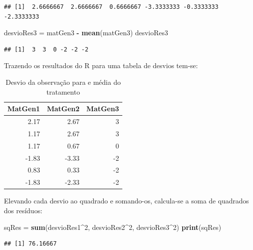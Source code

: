 \documentclass[
]{article}
\newenvironment{Shaded}{\begin{snugshade}}{\end{snugshade}}
\newcommand{\DecValTok}[1]{\textcolor[rgb]{0.00,0.00,0.81}{#1}}
\newcommand{\KeywordTok}[1]{\textcolor[rgb]{0.13,0.29,0.53}{\textbf{#1}}}
\newcommand{\NormalTok}[1]{#1}
\newcommand{\OperatorTok}[1]{\textcolor[rgb]{0.81,0.36,0.00}{\textbf{#1}}}
\newcommand{\StringTok}[1]{\textcolor[rgb]{0.31,0.60,0.02}{#1}}
\begin{document}
\begin{verbatim}
## [1]  2.6666667  2.6666667  0.6666667 -3.3333333 -0.3333333 -2.3333333
\end{verbatim}

\begin{Shaded}
\begin{Highlighting}[]
\NormalTok{desvioRes3 =}\StringTok{ }\NormalTok{matGen3 }\OperatorTok{-}\StringTok{ }\KeywordTok{mean}\NormalTok{(matGen3)}
\NormalTok{desvioRes3}
\end{Highlighting}
\end{Shaded}

\begin{verbatim}
## [1]  3  3  0 -2 -2 -2
\end{verbatim}

Trazendo os resultados do R para uma tabela de desvios tem-se:

\begin{table}

\caption{\label{tab:unnamed-chunk-22}Desvio da observação para e média do tratamento}
\centering
\begin{tabular}[t]{r|r|r}
\hline
MatGen1 & MatGen2 & MatGen3\\
\hline
2.17 & 2.67 & 3\\
\hline
1.17 & 2.67 & 3\\
\hline
1.17 & 0.67 & 0\\
\hline
-1.83 & -3.33 & -2\\
\hline
0.83 & 0.33 & -2\\
\hline
-1.83 & -2.33 & -2\\
\hline
\end{tabular}
\end{table}

Elevando cada desvio ao quadrado e somando-os, calcula-se a soma de quadrados dos resíduos:

\begin{Shaded}
\begin{Highlighting}[]
\NormalTok{sqRes =}\StringTok{ }\KeywordTok{sum}\NormalTok{(desvioRes1}\OperatorTok{^}\DecValTok{2}\NormalTok{, desvioRes2}\OperatorTok{^}\DecValTok{2}\NormalTok{, desvioRes3}\OperatorTok{^}\DecValTok{2}\NormalTok{)}
\KeywordTok{print}\NormalTok{(sqRes)}
\end{Highlighting}
\end{Shaded}

\begin{verbatim}
## [1] 76.16667
\end{verbatim}
\end{document}
